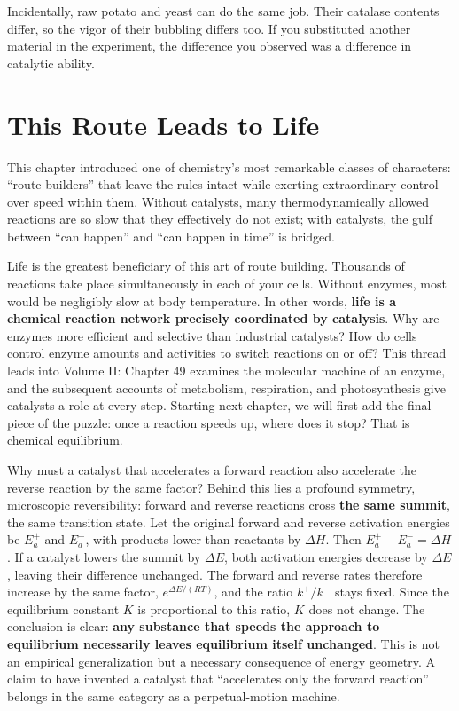 Incidentally, raw potato and yeast can do the same job. Their catalase contents differ, so the vigor of their bubbling differs too. If you substituted another material in the experiment, the difference you observed was a difference in catalytic ability.

\section{This Route Leads to Life}

This chapter introduced one of chemistry's most remarkable classes of characters: ``route builders'' that leave the rules intact while exerting extraordinary control over speed within them. Without catalysts, many thermodynamically allowed reactions are so slow that they effectively do not exist; with catalysts, the gulf between ``can happen'' and ``can happen in time'' is bridged.

Life is the greatest beneficiary of this art of route building. Thousands of reactions take place simultaneously in each of your cells. Without enzymes, most would be negligibly slow at body temperature. In other words, \textbf{life is a chemical reaction network precisely coordinated by catalysis}. Why are enzymes more efficient and selective than industrial catalysts? How do cells control enzyme amounts and activities to switch reactions on or off? This thread leads into Volume II: Chapter 49 examines the molecular machine of an enzyme, and the subsequent accounts of metabolism, respiration, and photosynthesis give catalysts a role at every step. Starting next chapter, we will first add the final piece of the puzzle: once a reaction speeds up, where does it stop? That is chemical equilibrium.

\begin{tiaozhan}
Why must a catalyst that accelerates a forward reaction also accelerate the reverse reaction by the same factor? Behind this lies a profound symmetry, microscopic reversibility: forward and reverse reactions cross \textbf{the same summit}, the same transition state. Let the original forward and reverse activation energies be $E_a^{+}$ and $E_a^{-}$, with products lower than reactants by $\Delta H$. Then $E_a^{+}-E_a^{-}=\Delta H$. If a catalyst lowers the summit by $\Delta E$, both activation energies decrease by $\Delta E$, leaving their difference unchanged. The forward and reverse rates therefore increase by the same factor, $e^{\Delta E/(RT)}$, and the ratio $k^{+}/k^{-}$ stays fixed. Since the equilibrium constant $K$ is proportional to this ratio, $K$ does not change. The conclusion is clear: \textbf{any substance that speeds the approach to equilibrium necessarily leaves equilibrium itself unchanged}. This is not an empirical generalization but a necessary consequence of energy geometry. A claim to have invented a catalyst that ``accelerates only the forward reaction'' belongs in the same category as a perpetual-motion machine.
\end{tiaozhan}

